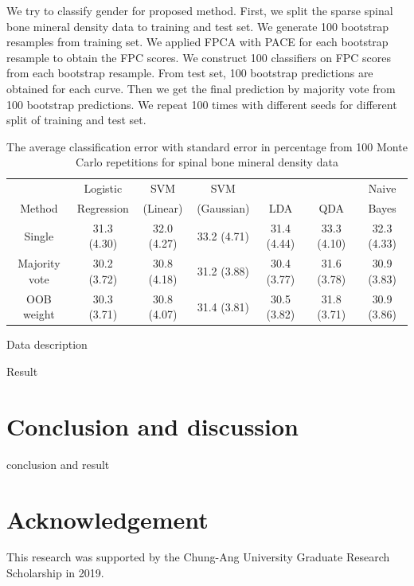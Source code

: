 \documentclass[eng]{csam}
\begin{document}
We try to classify gender for proposed method. First, we split the sparse spinal bone mineral density data to training and test set. We generate 100 bootstrap resamples from training set. We applied FPCA with PACE for each bootstrap resample to obtain the FPC scores. We construct 100 classifiers on FPC scores from each bootstrap resample. From test set, 100 bootstrap predictions are obtained for each curve. Then we get the final prediction by majority vote from 100 bootstrap predictions. We repeat 100 times with different seeds for different split of training and test set. 

\begin{table}[ht]
	\footnotesize
	\centering
	\caption{The average classification error with standard error in percentage from 100 Monte Carlo repetitions for spinal bone mineral density data}
	\tabcolsep=10.5pt
	\begin{tabular}{ccccccc}
		\hline \hline
		& Logistic   & SVM      & SVM        &     &     & Naive \\
		Method & Regression & (Linear) & (Gaussian) & LDA & QDA & Bayes \\ 
		\hline
		Single        & 31.3 (4.30) & 32.0 (4.27) & 33.2 (4.71) & 31.4 (4.44) & 33.3 (4.10) & 32.3 (4.33) \\ 
		Majority vote & 30.2 (3.72) & 30.8 (4.18) & 31.2 (3.88) & 30.4 (3.77) & 31.6 (3.78) & 30.9 (3.83) \\ 
		OOB weight    & 30.3 (3.71) & 30.8 (4.07) & 31.4 (3.81) & 30.5 (3.82) & 31.8 (3.71) & 30.9 (3.86) \\ 
		\hline \hline
	\end{tabular}
\end{table}


{\color{red}
	Data description
	
	Result	
}


\section{Conclusion and discussion}
{\color{red}
	conclusion and result	
}




\section*{Acknowledgement}
This research was supported by the Chung-Ang University Graduate Research Scholarship in 2019.
\end{document}
